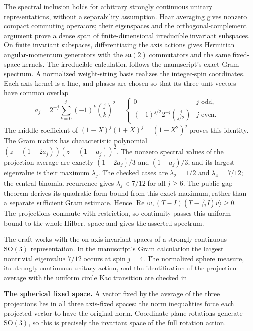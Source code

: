 \begin{theorem}
  The spectral inclusion holds for arbitrary strongly continuous
  unitary representations, without a separability assumption. Haar averaging
  gives nonzero compact commuting operators; their eigenspaces and the
  orthogonal-complement argument prove a dense span of finite-dimensional
  irreducible invariant subspaces. On finite invariant subspaces, differentiating
  the axis actions gives Hermitian angular-momentum generators with the
  $\mathfrak{su}(2)$ commutators and the same fixed-space kernels.
  The irreducible calculation follows the manuscript's exact Gram spectrum.
  A normalized weight-string basis realizes the integer-spin coordinates.
  Each axis kernel is a line, and phases are chosen so that its three unit
  vectors have common overlap
  \[
    a_j=2^{-j}\sum_{k=0}^j(-1)^k\binom jk^2
      =\begin{cases}0&j\text{ odd},\\
        (-1)^{j/2}2^{-j}\binom j{j/2}&j\text{ even}.
        \end{cases}
  \]
  The middle coefficient of $(1-X)^j(1+X)^j=(1-X^2)^j$ proves this identity.
  The Gram matrix has characteristic polynomial
  $(z-(1+2a_j))(z-(1-a_j))^2$. The nonzero spectral values of the projection
  average are exactly $(1+2a_j)/3$ and $(1-a_j)/3$, and its largest eigenvalue
  is their maximum $\lambda_j$. The checked cases are $\lambda_2=1/2$ and
  $\lambda_4=7/12$; the central-binomial recurrence gives
  $\lambda_j<7/12$ for all $j\ge6$. The public gap theorem derives its
  quadratic-form bound from this exact maximum, rather than a separate
  sufficient Gram estimate.
  Hence $\operatorname{Re}\langle v,(T-I)(T-\tfrac7{12}I)v\rangle\ge0$.
  The projections commute with restriction, so continuity passes this
  uniform bound to the whole Hilbert space and gives the asserted spectrum.

  The draft works with the 
  on axis-invariant spaces of a strongly continuous $\mathrm{SO}(3)$
  representation. In the manuscript's Gram calculation the largest
  nontrivial eigenvalue $7/12$ occurs at spin $j=4$.
  The normalized sphere measure, its strongly continuous unitary action,
  and the identification of the projection average with the uniform circle
  Kac transition are checked in .

  \textbf{The spherical fixed space.} A vector fixed by the average
  of the three projections lies in all three axis-fixed spaces: the norm
  inequalities force each projected vector to have the original norm.
  Coordinate-plane rotations generate $\mathrm{SO}(3)$, so this is precisely
  the invariant space of the full rotation action.


\end{theorem}
